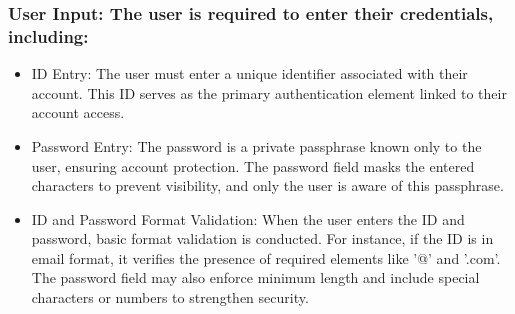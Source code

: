 \documentclass[conference]{IEEEtran}
\begin{document}
\subsubsection{User Input: The user is required to enter their credentials, including:}
\begin{itemize}
    \item ID Entry: The user must enter a unique identifier associated with their account. This ID serves as the primary authentication element linked to their account access.\\
    \item Password Entry: The password is a private passphrase known only to the user, ensuring account protection. The password field masks the entered characters to prevent visibility, and only the user is aware of this passphrase.\\
    \item ID and Password Format Validation: When the user enters the ID and password, basic format validation is conducted. For instance, if the ID is in email format, it verifies the presence of required elements like '@' and '.com'. The password field may also enforce minimum length and include special characters or numbers to strengthen security.\\
\end{itemize}
\end{document}
